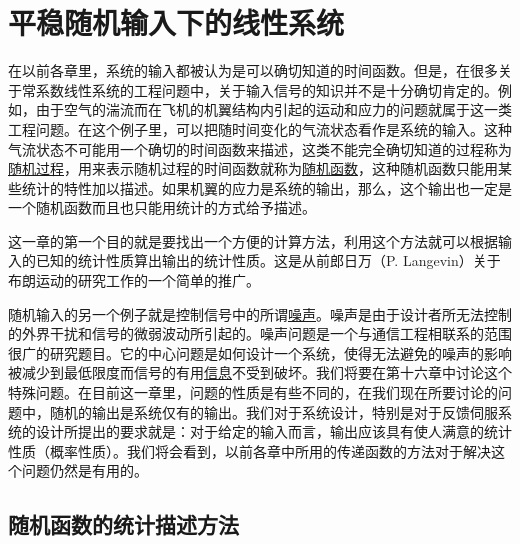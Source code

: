 
\chapter{平稳随机输入下的线性系统}

在以前各章里，系统的输入都被认为是可以确切知道的时间函数。但是，在很多关于常系数线性系统的工程问题中，关于输入信号的知识并不是十分确切肯定的。例如，由于空气的湍流而在飞机的机翼结构内引起的运动和应力的问题就属于这一类工程问题。在这个例子里，可以把随时间变化的气流状态看作是系统的输入。这种气流状态不可能用一个确切的时间函数来描述，这类不能完全确切知道的过程称为\underline{随机过程}，用来表示随机过程的时间函数就称为\underline{随机函数}，这种随机函数只能用某些统计的特性加以描述。如果机翼的应力是系统的输出，那么，这个输出也一定是一个随机函数而且也只能用统计的方式给予描述。

这一章的第一个目的就是要找出一个方便的计算方法，利用这个方法就可以根据输入的已知的统计性质算出输出的统计性质。这是从前郎日万（P. Langevin）关于布朗运动的研究工作的一个简单的推广。

随机输入的另一个例子就是控制信号中的所谓\underline{噪声}。噪声是由于设计者所无法控制的外界干扰和信号的微弱波动所引起的。噪声问题是一个与通信工程相联系的范围很广的研究题目。它的中心问题是如何设计一个系统，使得无法避免的噪声的影响被减少到最低限度而信号的有用\underline{信息}不受到破坏。我们将要在第十六章中讨论这个特殊问题。在目前这一章里，问题的性质是有些不同的，在我们现在所要讨论的问题中，随机的输出是系统仅有的输出。我们对于系统设计，特别是对于反馈伺服系统的设计所提出的要求就是：对于给定的输入而言，输出应该具有使人满意的统计性质（概率性质）。我们将会看到，以前各章中所用的传递函数的方法对于解决这个问题仍然是有用的。

\section{随机函数的统计描述方法}\label{chapter9_section1}

